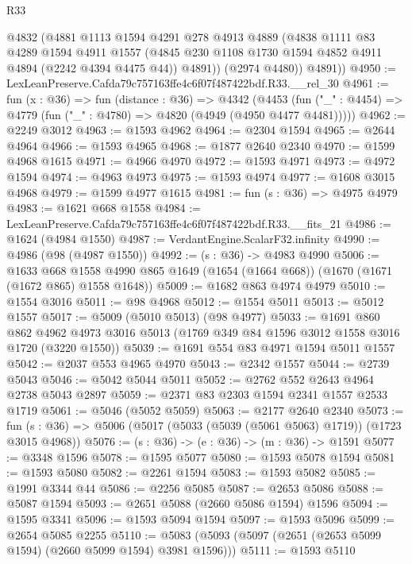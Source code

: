 \begin{lexlean}{R33}
\begin{coremodule}
          @4832
          (@4881
            @1113
            @1594
            @4291
            @278
            @4913
            @4889
            (@4838
              @1111
              @83
              @4289
              @1594
              @4911
              @1557
              (@4845 @230 @1108 @1730 @1594 @4852 @4911 @4894 (@2242 @4394 @4475 @44))
              @4891))
          (@2974 @4480))
        @4891))
@4950 := LexLeanPreserve.Cafda79c757163ffe4c6f07f487422bdf.R33.__rel_30
@4961 := fun (x : @36) =>
  fun (distance : @36) =>
  @4342
    (@4453 (fun ("_" : @4454) => @4779 (fun ("_" : @4780) => @4820 (@4949 (@4950 @4477 @4481)))))
@4962 := @2249 @3012
@4963 := @1593 @4962
@4964 := @2304 @1594
@4965 := @2644 @4964
@4966 := @1593 @4965
@4968 := @1877 @2640 @2340
@4970 := @1599 @4968 @1615
@4971 := @4966 @4970
@4972 := @1593 @4971
@4973 := @4972 @1594
@4974 := @4963 @4973
@4975 := @1593 @4974
@4977 := @1608 @3015 @4968
@4979 := @1599 @4977 @1615
@4981 := fun (s : @36) => @4975 @4979
@4983 := @1621 @668 @1558
@4984 := LexLeanPreserve.Cafda79c757163ffe4c6f07f487422bdf.R33.__fits_21
@4986 := @1624 (@4984 @1550)
@4987 := VerdantEngine.ScalarF32.infinity
@4990 := @4986 (@98 (@4987 @1550))
@4992 := (s : @36) -> @4983 @4990
@5006 := @1633
    @668
    @1558
    @4990
    @865
    @1649
    (@1654 (@1664 @668))
    (@1670 (@1671 (@1672 @865) @1558 @1648))
@5009 := @1682 @863 @4974 @4979
@5010 := @1554 @3016
@5011 := @98 @4968
@5012 := @1554 @5011
@5013 := @5012 @1557
@5017 := @5009 (@5010 @5013) (@98 @4977)
@5033 := @1691
    @860
    @862
    @4962
    @4973
    @3016
    @5013
    (@1769 @349 @84 @1596 @3012 @1558 @3016 @1720 (@3220 @1550))
@5039 := @1691 @554 @83 @4971 @1594 @5011 @1557
@5042 := @2037 @553 @4965 @4970
@5043 := @2342 @1557
@5044 := @2739 @5043
@5046 := @5042 @5044 @5011
@5052 := @2762 @552 @2643 @4964 @2738 @5043 @2897
@5059 := @2371 @83 @2303 @1594 @2341 @1557 @2533 @1719
@5061 := @5046 (@5052 @5059)
@5063 := @2177 @2640 @2340
@5073 := fun (s : @36) => @5006 (@5017 (@5033 (@5039 (@5061 @5063) @1719)) (@1723 @3015 @4968))
@5076 := (s : @36) -> (e : @36) -> (m : @36) -> @1591
@5077 := @3348 @1596
@5078 := @1595 @5077
@5080 := @1593 @5078 @1594
@5081 := @1593 @5080
@5082 := @2261 @1594
@5083 := @1593 @5082
@5085 := @1991 @3344 @44
@5086 := @2256 @5085
@5087 := @2653 @5086
@5088 := @5087 @1594
@5093 := @2651 @5088 (@2660 @5086 @1594) @1596
@5094 := @1595 @3341
@5096 := @1593 @5094 @1594
@5097 := @1593 @5096
@5099 := @2654 @5085 @2255
@5110 := @5083 (@5093 (@5097 (@2651 (@2653 @5099 @1594) (@2660 @5099 @1594) @3981 @1596)))
@5111 := @1593 @5110

\end{coremodule}
\end{lexlean}
